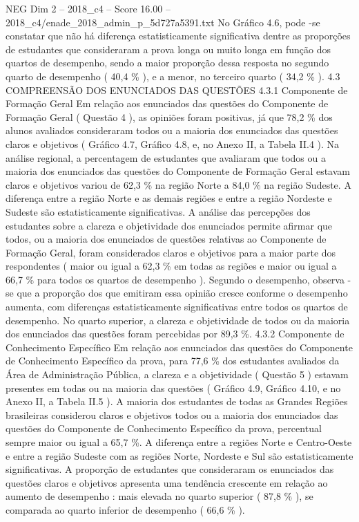 \begin{textsample}{NEG Dim 2 – 2018\_c4 – Score 16.00 – 2018\_c4/enade\_2018\_admin\_p\_5d727a5391.txt}
No Gráfico 4.6, pode -se constatar que não há diferença estatisticamente significativa dentre as proporções de estudantes que consideraram a prova longa ou muito longa em função dos quartos de desempenho, sendo a maior proporção dessa resposta no segundo quarto de desempenho ( 40,4 \% ), e a menor, no terceiro quarto ( 34,2 \% ). 4.3 COMPREENSÃO DOS ENUNCIADOS DAS QUESTÕES 4.3.1 Componente de Formação Geral Em relação aos enunciados das questões do Componente de Formação Geral ( Questão 4 ), as opiniões foram positivas, já que 78,2 \% dos alunos avaliados consideraram todos ou a maioria dos enunciados das questões claros e objetivos ( Gráfico 4.7, Gráfico 4.8, e, no Anexo II, a Tabela II.4 ).
Na análise regional, a percentagem de estudantes que avaliaram que todos ou a maioria dos enunciados das questões do Componente de Formação Geral estavam claros e objetivos variou de 62,3 \% na região Norte a 84,0 \% na região Sudeste.
A diferença entre a região Norte e as demais regiões e entre a região Nordeste e Sudeste são estatisticamente significativas.
A análise das percepções dos estudantes sobre a clareza e objetividade dos enunciados permite afirmar que todos, ou a maioria dos enunciados de questões relativas ao Componente de Formação Geral, foram considerados claros e objetivos para a maior parte dos respondentes ( maior ou igual a 62,3 \% em todas as regiões e maior ou igual a 66,7 \% para todos os quartos de desempenho ).
Segundo o desempenho, observa -se que a proporção dos que emitiram essa opinião cresce conforme o desempenho aumenta, com diferenças estatisticamente significativas entre todos os quartos de desempenho.
No quarto superior, a clareza e objetividade de todos ou da maioria dos enunciados das questões foram percebidas por 89,3 \%. 4.3.2 Componente de Conhecimento Específico Em relação aos enunciados das questões do Componente de Conhecimento Específico da prova, para 77,6 \% dos estudantes avaliados da Área de Administração Pública, a clareza e a objetividade ( Questão 5 ) estavam presentes em todas ou na maioria das questões ( Gráfico 4.9, Gráfico 4.10, e no Anexo II, a Tabela II.5 ).
A maioria dos estudantes de todas as Grandes Regiões brasileiras considerou claros e objetivos todos ou a maioria dos enunciados das questões do Componente de Conhecimento Específico da prova, percentual sempre maior ou igual a 65,7 \%.
A diferença entre a regiões Norte e Centro-Oeste e entre a região Sudeste com as regiões Norte, Nordeste e Sul são estatisticamente significativas.
A proporção de estudantes que consideraram os enunciados das questões claros e objetivos apresenta uma tendência crescente em relação ao aumento de desempenho : mais elevada no quarto superior ( 87,8 \% ), se comparada ao quarto inferior de desempenho ( 66,6 \% ).

\end{textsample}
